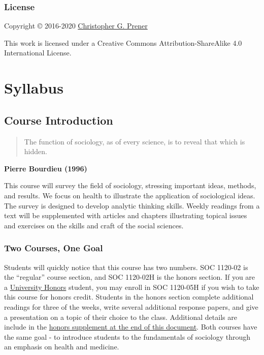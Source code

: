 \documentclass[]{book}
\begin{document}
\hypertarget{license}{%
\section*{License}\label{license}}

Copyright © 2016-2020 \href{https://chris-prener.github.io}{Christopher G. Prener}

This work is licensed under a Creative Commons Attribution-ShareAlike 4.0 International License.

\hypertarget{part-syllabus}{%
\part{Syllabus}\label{part-syllabus}}

\hypertarget{course-introduction}{%
\chapter{Course Introduction}\label{course-introduction}}

\begin{quote}
The function of sociology, as of every science, is to reveal that which is hidden.
\end{quote}

\textbf{Pierre Bourdieu (1996)}

This course will survey the field of sociology, stressing important ideas, methods, and results. We focus on health to illustrate the application of sociological ideas. The survey is designed to develop analytic thinking skills. Weekly readings from a text will be supplemented with articles and chapters illustrating topical issues and exercises on the skills and craft of the social sciences.

\hypertarget{two-courses-one-goal}{%
\section{Two Courses, One Goal}\label{two-courses-one-goal}}

Students will quickly notice that this course has two numbers. SOC 1120-02 is the ``regular'' course section, and SOC 1120-02H is the honors section. If you are a \href{https://www.slu.edu/honors/index.php}{University Honors} student, you may enroll in SOC 1120-05H if you wish to take this course for honors credit. Students in the honors section complete additional readings for three of the weeks, write several additional response papers, and give a presentation on a topic of their choice to the class. Additional details are include in the \href{/syllabus/honors-overview.html}{honors supplement at the end of this document}. Both courses have the same goal - to introduce students to the fundamentals of sociology through an emphasis on health and medicine.
\end{document}
